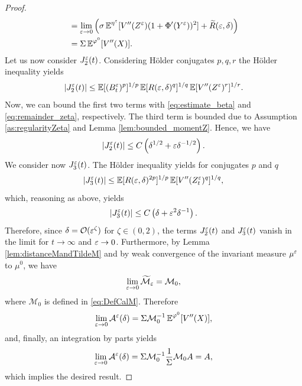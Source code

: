 \documentclass[10pt]{article}
\begin{document}
\begin{proof}
\begin{equation}
\begin{aligned}
	&= \lim_{\varepsilon \to 0} \left(\sigma \operatorname{\mathbb{E}}^{\eta^\varepsilon} [V''(Z^\varepsilon) (1 + \Phi'(Y^\varepsilon))^2] + \widetilde R(\varepsilon,\delta)\right)\\
	&= \Sigma \operatorname{\mathbb{E}}^{\varphi^0} [V''(X)].
	\end{aligned}
	\end{equation}
	Let us now consider $J_2^\varepsilon(t)$. Considering Hölder conjugates $p,q,r$ the Hölder inequality yields
	\begin{equation}
		\left\lvert J_2^\varepsilon(t)\right\rvert \leq \operatorname{\mathbb{E}}[(B_t^\varepsilon)^p]^{1/p}\operatorname{\mathbb{E}}[R(\varepsilon,\delta)^q]^{1/q}\operatorname{\mathbb{E}}[V''(Z^\varepsilon)^r]^{1/r}.
	\end{equation}
	Now, we can bound the first two terms with \eqref{eq:estimate_beta} and \eqref{eq:remainder_zeta}, respectively. The third term is bounded due to Assumption \ref{as:regularityZeta} and Lemma \ref{lem:bounded_momentZ}. Hence, we have
	\begin{equation}
		\left\lvert J_2^\varepsilon(t)\right\rvert \le C \left( \delta^{1/2} + \varepsilon \delta^{-1/2} \right).
	\end{equation}
	We consider now $J_3^\varepsilon(t)$. The Hölder inequality yields for conjugates $p$ and $q$
	\begin{equation}
		\left\lvert J_3^\varepsilon(t)\right\rvert \le \operatorname{\mathbb{E}}[R(\varepsilon, \delta)^{2p}]^{1/p} \operatorname{\mathbb{E}}[V''(Z_t^\varepsilon)^q]^{1/q},
	\end{equation}
	which, reasoning as above, yields
	\begin{equation}
		\left\lvert J_3^\varepsilon(t)\right\rvert \le C \left( \delta + \varepsilon^2 \delta^{-1} \right).
	\end{equation}
	Therefore, since $\delta = \mathcal O(\varepsilon^\zeta)$ for $\zeta \in (0, 2)$, the terms $J_2^\varepsilon(t)$ and $J_3^\varepsilon(t)$ vanish in the limit for $t \to \infty$ and $\varepsilon \to 0$. Furthermore, by Lemma \ref{lem:distanceMandTildeM} and by weak convergence of the invariant measure $\mu^\varepsilon$ to $\mu^0$, we have
	\begin{equation}
	\lim_{\varepsilon \to 0} \widetilde{\mathcal M}_\varepsilon = \mathcal M_0,
	\end{equation}
	where $\mathcal M_0$ is defined in \eqref{eq:DefCalM}. Therefore
	\begin{equation}
	\lim_{\varepsilon \to 0} \mathcal A^\varepsilon(\delta) = \Sigma \mathcal M_0^{-1} \operatorname{\mathbb{E}}^{\varphi^0} [V''(X)],
	\end{equation}
	and, finally, an integration by parts yields
	\begin{equation}
	\lim_{\varepsilon \to 0} \mathcal A^\varepsilon(\delta) = \Sigma \mathcal M_0^{-1} \frac1\Sigma \mathcal M_0 A = A,
	\end{equation}
	which implies the desired result.
\end{proof}
\end{document}
